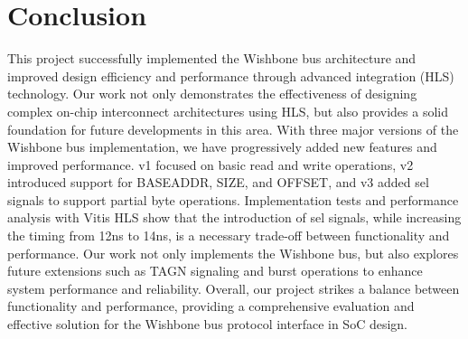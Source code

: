 \documentclass[conference]{IEEEtran}
\begin{document}
\section{Conclusion}
This project successfully implemented the Wishbone bus architecture and improved design efficiency and performance through advanced integration (HLS) technology. Our work not only demonstrates the effectiveness of designing complex on-chip interconnect architectures using HLS, but also provides a solid foundation for future developments in this area. With three major versions of the Wishbone bus implementation, we have progressively added new features and improved performance. v1 focused on basic read and write operations, v2 introduced support for BASEADDR, SIZE, and OFFSET, and v3 added sel signals to support partial byte operations. Implementation tests and performance analysis with Vitis HLS show that the introduction of sel signals, while increasing the timing from 12ns to 14ns, is a necessary trade-off between functionality and performance. Our work not only implements the Wishbone bus, but also explores future extensions such as TAGN signaling and burst operations to enhance system performance and reliability. Overall, our project strikes a balance between functionality and performance, providing a comprehensive evaluation and effective solution for the Wishbone bus protocol interface in SoC design.









\printbibliography[title={References},resetnumbers=true,heading=subbibliography]
\clearpage
\end{document}
